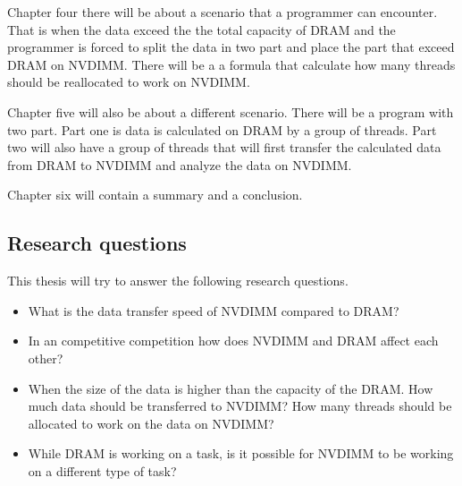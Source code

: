 \documentclass[12pt,a4paper,USenglish]{article}      %
\begin{document}
Chapter four there will be about a scenario that a programmer can encounter. That is when the data exceed the the total capacity of DRAM and the programmer is forced to split the data in two part and place the part that exceed DRAM on NVDIMM. There will be a a formula that calculate how many threads should be reallocated to work on NVDIMM.

Chapter five will also be about a different scenario. There will be a program with two part. Part one is data is calculated on DRAM by a group of threads. Part two will also have a group of threads that will first transfer the calculated data from DRAM to NVDIMM and analyze the data on NVDIMM. 

Chapter six will contain a summary and a conclusion.

\subsection{Research questions}
This thesis will try to answer the following research questions.
\begin{itemize}
\item What is the data transfer speed of NVDIMM compared to DRAM?
\item In an competitive competition how does NVDIMM and DRAM affect each other?
\item When the size of the data is higher than the capacity of the DRAM. How much data should be transferred to NVDIMM? How many threads should be allocated to work on the data on NVDIMM?
\item While DRAM is working on a task, is it possible for NVDIMM to be working on a different type of task?
\end{itemize}


%
\printbibliography
\end{document}
